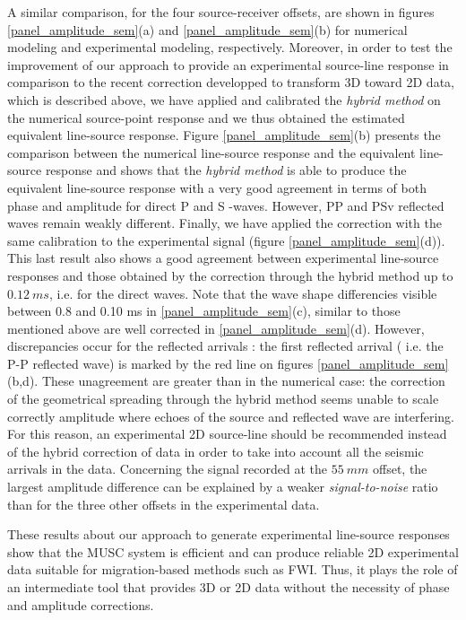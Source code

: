 \documentclass[manuscript,revised]{geophysics}
\begin{document}
\noindent A similar comparison, for the four source-receiver offsets, are shown in figures \ref{panel_amplitude_sem}(a) and \ref{panel_amplitude_sem}(b) for numerical modeling and experimental modeling, respectively. Moreover, in order to test the improvement of our approach to provide an experimental source-line response in comparison to the recent correction developped to transform 3D toward 2D data, which is described above, we have applied and calibrated the \textit{hybrid method} \citep{Forbriger_LSS_2014,Schafer_LSS_2014} on the numerical source-point response and we thus obtained the estimated equivalent line-source response. Figure \ref{panel_amplitude_sem}(b) presents the comparison between the numerical line-source response and the equivalent line-source response and shows that the \textit{hybrid method} is able to produce the equivalent line-source response with a very good agreement in terms of both phase and amplitude for direct P and S -waves.  However, PP and PSv reflected waves remain weakly different. Finally, we have applied the correction with the same calibration to the experimental signal (figure \ref{panel_amplitude_sem}(d)). This last result also shows a good agreement between experimental line-source responses and those obtained by the correction through the hybrid method up to $0.12\ ms$, i.e. for the direct waves. Note that the wave shape differencies visible between 0.8 and 0.10 ms in \ref{panel_amplitude_sem}(c), similar to those mentioned above are well corrected in \ref{panel_amplitude_sem}(d).
However, discrepancies occur for the reflected arrivals : the first reflected arrival ( i.e. the P-P reflected wave) is marked by the red line on figures \ref{panel_amplitude_sem}(b,d). These unagreement are greater than in the numerical case: the correction of the geometrical spreading through the hybrid method seems unable to scale correctly amplitude where echoes of the source and reflected wave are interfering. For this reason, an experimental 2D source-line should be recommended instead of the hybrid correction of data in order to take into account all the seismic arrivals in the data.  Concerning the signal recorded at the $55\ mm$ offset, the largest amplitude difference can be explained by a weaker \textit{signal-to-noise} ratio than for the three other offsets in the experimental data.  

\noindent These results about our approach to generate experimental line-source responses show that the MUSC system is efficient and can produce reliable 2D experimental data suitable for migration-based methods such as FWI. Thus, it plays the role of an intermediate tool that provides 3D or 2D data without the necessity of phase and amplitude corrections.
\end{document}
